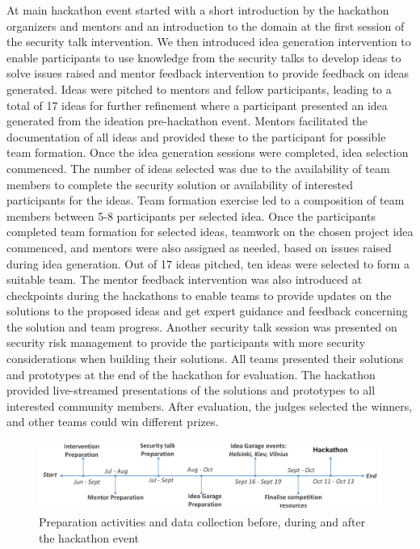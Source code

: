 \documentclass[runningheads]{llncs}
\begin{document}
At main hackathon event started with a short introduction by the hackathon organizers and mentors and an introduction to the domain at the first session of the security talk intervention. We then introduced idea generation intervention to enable participants to use knowledge from the security talks to develop ideas to solve issues raised and mentor feedback intervention to provide feedback on ideas generated.
Ideas were pitched to mentors and fellow participants, leading to a total of 17 ideas for further refinement where a participant presented an idea generated from the ideation pre-hackathon event. Mentors facilitated the documentation of all ideas and provided these to the participant for possible team formation. Once the idea generation sessions were completed, idea selection commenced. The number of ideas selected was due to the availability of team members to complete the security solution or availability of interested participants for the ideas. 
Team formation exercise led to a composition of team members between 5-8 participants per selected idea. Once the participants completed team formation for selected ideas, teamwork on the chosen project idea commenced, and mentors were also assigned as needed, based on issues raised during idea generation. Out of 17 ideas pitched, ten ideas were selected to form a suitable team. The mentor feedback intervention was also introduced at checkpoints during the hackathons to enable teams to provide updates on the solutions to the proposed ideas and get expert guidance and feedback concerning the solution and team progress. Another security talk session was presented on security risk management to provide the participants with more security considerations when building their solutions. 
All teams presented their solutions and prototypes at the end of the hackathon for evaluation. The hackathon provided live-streamed presentations of the solutions and prototypes to all interested community members. After evaluation, the judges selected the winners, and other teams could win different prizes.

\begin{figure}[h]
  \centering
  \includegraphics[width=\linewidth]{timelinehack.pdf}
  \caption{Preparation activities and data collection before, during and after the hackathon event} \label{Fig:timeline} 
\end{figure}
\end{document}
